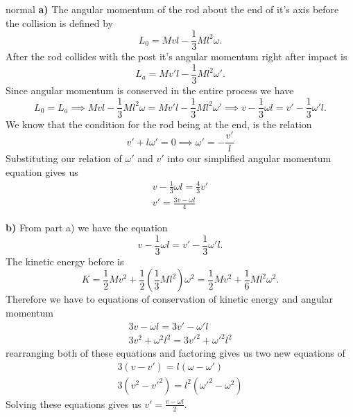\begin{solution}{normal}
\textbf{a)} The angular momentum of the rod about the end of it's axis before the collision is defined by
\[L_0=Mvl-\frac{1}{3}Ml^2\omega.\]
After the rod collides with the post it's angular momentum right after impact is 
\[L_a=Mv'l-\frac{1}{3}Ml^2\omega'.\]
Since angular momentum is conserved in the entire process we have
\[L_0=L_a\implies Mvl-\frac{1}{3}Ml^2\omega=Mv'l-\frac{1}{3}Ml^2\omega'\implies v-\frac{1}{3}\omega l=v'-\frac{1}{3}\omega' l.\]
We know that the condition for the rod being at the end, is the relation 
\[
v' + l\omega' = 0\implies \omega' = -\frac{v'}{l}
\]Substituting our relation of $\omega'$ and $v'$ into our simplified angular momentum equation gives us
\begin{align*}
v-\frac{1}{3}\omega l = \frac{4}{3}v'\\
\boxed{v' = \frac{3v - \omega l}{4}}
\end{align*}

\textbf{b)} From part a) we have the equation 
\[v-\frac{1}{3}\omega l=v'-\frac{1}{3}\omega' l.\]
The kinetic energy before is 
\[K=\frac{1}{2}Mv^2+\frac{1}{2}\left(\frac{1}{3}Ml^2\right)\omega^2=\frac{1}{2}Mv^2+\frac{1}{6}Ml^2\omega^2.\]
Therefore we have to equations of conservation of kinetic energy and angular momentum
\begin{align*}
3v-\omega l=3v'-\omega' l\\
3v^2+\omega^2 l^2=3v'^2+\omega'^2 l^2
\end{align*}
rearranging both of these equations and factoring gives us two new equations of
\begin{align*}
3(v-v')=l(\omega-\omega')\\
3(v^2-v'^2)=l^2(\omega'^2-\omega^2)
\end{align*}
Solving these equations gives us $\boxed{v'=\frac{v-\omega l}{2}}$.
\end{solution}
